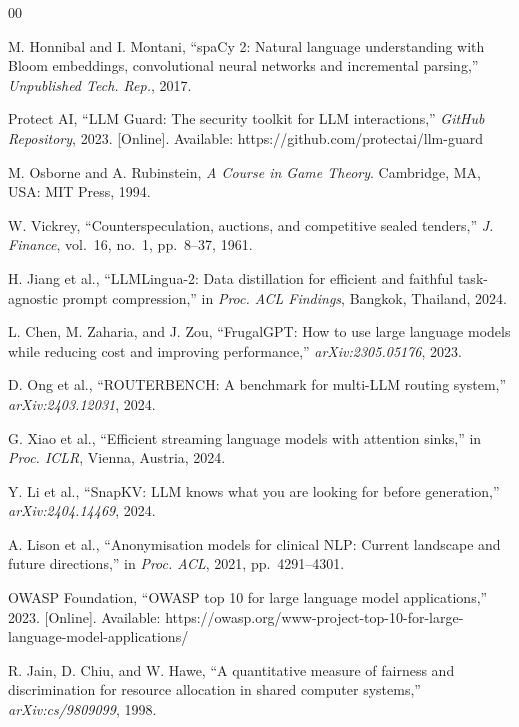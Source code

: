 \documentclass[conference]{IEEEtran}
\begin{document}
\begin{thebibliography}{00}

M. Honnibal and I. Montani, ``spaCy 2: Natural language understanding with
Bloom embeddings, convolutional neural networks and incremental parsing,''
\textit{Unpublished Tech. Rep.}, 2017.

Protect AI, ``LLM Guard: The security toolkit for LLM interactions,''
\textit{GitHub Repository}, 2023. [Online]. Available:
https://github.com/protectai/llm-guard

M. Osborne and A. Rubinstein, \textit{A Course in Game Theory}.
Cambridge, MA, USA: MIT Press, 1994.

W. Vickrey, ``Counterspeculation, auctions, and competitive sealed tenders,''
\textit{J. Finance}, vol.~16, no.~1, pp.~8--37, 1961.

H. Jiang et al., ``LLMLingua-2: Data distillation for efficient and faithful
task-agnostic prompt compression,'' in \textit{Proc. ACL Findings},
Bangkok, Thailand, 2024.

L. Chen, M. Zaharia, and J. Zou, ``FrugalGPT: How to use large language
models while reducing cost and improving performance,''
\textit{arXiv:2305.05176}, 2023.

D. Ong et al., ``ROUTERBENCH: A benchmark for multi-LLM routing system,''
\textit{arXiv:2403.12031}, 2024.

G. Xiao et al., ``Efficient streaming language models with attention sinks,''
in \textit{Proc. ICLR}, Vienna, Austria, 2024.

Y. Li et al., ``SnapKV: LLM knows what you are looking for before generation,''
\textit{arXiv:2404.14469}, 2024.

A. Lison et al., ``Anonymisation models for clinical NLP: Current landscape
and future directions,'' in \textit{Proc. ACL}, 2021, pp.~4291--4301.

OWASP Foundation, ``OWASP top 10 for large language model applications,''
2023. [Online]. Available:
https://owasp.org/www-project-top-10-for-large-language-model-applications/

R. Jain, D. Chiu, and W. Hawe, ``A quantitative measure of fairness and
discrimination for resource allocation in shared computer systems,''
\textit{arXiv:cs/9809099}, 1998.


\end{thebibliography}
\end{document}
